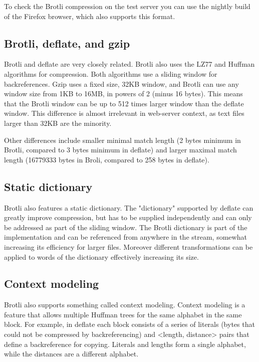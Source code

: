 \documentclass[12pt]{article}
\begin{document}
To check the Brotli compression on the test server you can use the
nightly build of the Firefox browser, which also supports this format.

\subsection{Brotli, deflate, and gzip}

Brotli and deflate are very closely related. Brotli also uses the LZ77
and Huffman algorithms for compression. Both algorithms use a sliding
window for backreferences. Gzip uses a fixed size, 32KB window, and
Brotli can use any window size from 1KB to 16MB, in powers of 2 (minus
16 bytes). This means that the Brotli window can be up to 512 times
larger window than the deflate window. This difference is almost
irrelevant in web-server context, as text files larger than 32KB are the
minority.

Other differences include smaller minimal match length (2 bytes minimum
in Brotli, compared to 3 bytes minimum in deflate) and larger maximal
match length (16779333 bytes in Broli, compared to 258 bytes in
deflate).

\subsection{Static dictionary}

Brotli also features a static dictionary. The "dictionary" supported by
deflate can greatly improve compression, but has to be supplied
independently and can only be addressed as part of the sliding window.
The Brotli dictionary is part of the implementation and can be
referenced from anywhere in the stream, somewhat increasing its
efficiency for larger files. Moreover different transformations can be
applied to words of the dictionary effectively increasing its size.

\subsection{Context modeling}

Brotli also supports something called context modeling. Context modeling
is a feature that allows multiple Huffman trees for the same alphabet in
the same block. For example, in deflate each block consists of a series
of literals (bytes that could not be compressed by backreferencing) and
<length, distance> pairs that define a backreference for copying.
Literals and lengths form a single alphabet, while the distances are a
different alphabet.
\end{document}

